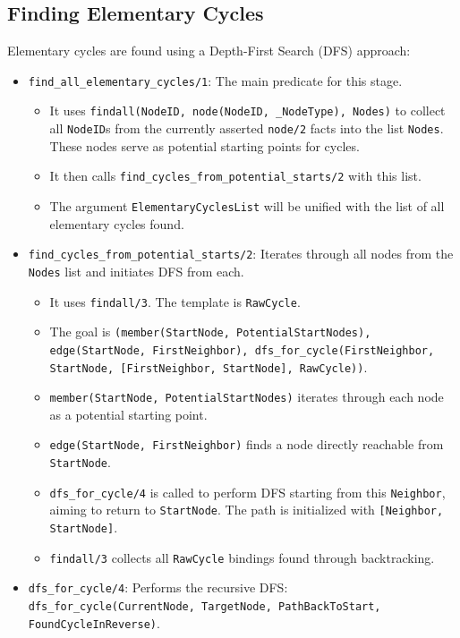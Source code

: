 \documentclass[12pt,a4paper]{article}
\begin{document}
\subsection{Finding Elementary Cycles}
Elementary cycles are found using a Depth-First Search (DFS) approach:
\begin{itemize}
\item \texttt{find\_all\_elementary\_cycles/1}: The main predicate for this stage.
\begin{itemize}
\item It uses \texttt{findall(NodeID, node(NodeID, \_NodeType), Nodes)} to collect all \texttt{NodeID}s from the currently asserted \texttt{node/2} facts into the list \texttt{Nodes}. These nodes serve as potential starting points for cycles.
\item It then calls \texttt{find\_cycles\_from\_potential\_starts/2} with this list.
\item The argument \texttt{ElementaryCyclesList} will be unified with the list of all elementary cycles found.
\end{itemize}
\item \texttt{find\_cycles\_from\_potential\_starts/2}: Iterates through all nodes from the \texttt{Nodes} list and initiates DFS from each.
\begin{itemize}
\item It uses \texttt{findall/3}. The template is \texttt{RawCycle}.
\item The goal is \texttt{(member(StartNode, PotentialStartNodes), edge(StartNode, FirstNeighbor), dfs\_for\_cycle(FirstNeighbor, StartNode, [FirstNeighbor, StartNode], RawCycle))}.
\item \texttt{member(StartNode, PotentialStartNodes)} iterates through each node as a potential starting point.
\item \texttt{edge(StartNode, FirstNeighbor)} finds a node directly reachable from \texttt{StartNode}.
\item \texttt{dfs\_for\_cycle/4} is called to perform DFS starting from this \texttt{Neighbor}, aiming to return to \texttt{StartNode}. The path is initialized with \texttt{[Neighbor, StartNode]}.
\item \texttt{findall/3} collects all \texttt{RawCycle} bindings found through backtracking.
\end{itemize}
\item \texttt{dfs\_for\_cycle/4}: Performs the recursive DFS: \texttt{dfs\_for\_cycle(CurrentNode, TargetNode, PathBackToStart, FoundCycleInReverse)}.
\begin{itemize}

\end{itemize}
\end{itemize}
\end{document}
